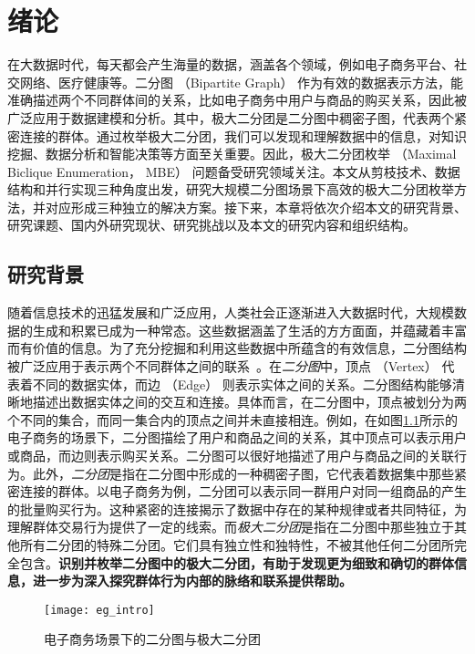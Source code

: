 \chapter{绪论}

在大数据时代，每天都会产生海量的数据，涵盖各个领域，例如电子商务平台、社交网络、医疗健康等。二分图 （Bipartite Graph） 作为有效的数据表示方法，能准确描述两个不同群体间的关系，比如电子商务中用户与商品的购买关系，因此被广泛应用于数据建模和分析。其中，极大二分团是二分图中稠密子图，代表两个紧密连接的群体。通过枚举极大二分团，我们可以发现和理解数据中的信息，对知识挖掘、数据分析和智能决策等方面至关重要。因此，极大二分团枚举 （Maximal Biclique Enumeration， MBE） 问题备受研究领域关注。本文从剪枝技术、数据结构和并行实现三种角度出发，研究大规模二分图场景下高效的极大二分团枚举方法，并对应形成三种独立的解决方案。接下来，本章将依次介绍本文的研究背景、研究课题、国内外研究现状、研究挑战以及本文的研究内容和组织结构。


\section{研究背景}

随着信息技术的迅猛发展和广泛应用，人类社会正逐渐进入大数据时代，大规模数据的生成和积累已成为一种常态。这些数据涵盖了生活的方方面面，并蕴藏着丰富而有价值的信息。为了充分挖掘和利用这些数据中所蕴含的有效信息，二分图结构被广泛应用于表示两个不同群体之间的联系~\cite{bipartite22}。在\emph{二分图}中，顶点 （Vertex） 代表着不同的数据实体，而边 （Edge） 则表示实体之间的关系。二分图结构能够清晰地描述出数据实体之间的交互和连接。具体而言，在二分图中，顶点被划分为两个不同的集合，而同一集合内的顶点之间并未直接相连。例如，在如图\ref{fig:eg_intro}所示的电子商务的场景下，二分图描绘了用户和商品之间的关系，其中顶点可以表示用户或商品，而边则表示购买关系。二分图可以很好地描述了用户与商品之间的关联行为。此外，\emph{二分团}是指在二分图中形成的一种稠密子图，它代表着数据集中那些紧密连接的群体。以电子商务为例，二分团可以表示同一群用户对同一组商品的产生的批量购买行为。这种紧密的连接揭示了数据中存在的某种规律或者共同特征，为理解群体交易行为提供了一定的线索。而\emph{极大二分团}是指在二分图中那些独立于其他所有二分团的特殊二分团。它们具有独立性和独特性，不被其他任何二分团所完全包含。\textbf{识别并枚举二分图中的极大二分团，有助于发现更为细致和确切的群体信息，进一步为深入探究群体行为内部的脉络和联系提供帮助。}

\begin{figure} [ht]
  \centering
  \vspace{0.05in}
  \texttt{[image: eg\_intro]}
  \vspace{0.05in}
  \caption{电子商务场景下的二分图与极大二分团}
  \label{fig:eg_intro}
\end{figure}



